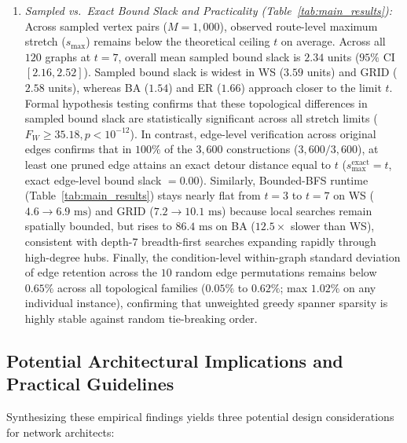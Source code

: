 \documentclass[conference]{IEEEtran}
\begin{document}
\begin{enumerate}
    \item \textit{Sampled vs.\ Exact Bound Slack and Practicality (Table~\ref{tab:main_results}):} Across sampled vertex pairs ($M = 1,000$), observed route-level maximum stretch ($s_{\max}$) remains below the theoretical ceiling $t$ on average. Across all $120$ graphs at $t=7$, overall mean sampled bound slack is $2.34$ units ($95\%$ CI $[2.16, 2.52]$). Sampled bound slack is widest in WS ($3.59$ units) and GRID ($2.58$ units), whereas BA ($1.54$) and ER ($1.66$) approach closer to the limit $t$. Formal hypothesis testing confirms that these topological differences in sampled bound slack are statistically significant across all stretch limits ($F_W \ge 35.18, p < 10^{-12}$). In contrast, edge-level verification across original edges confirms that in $100\%$ of the $3,600$ constructions ($3,600/3,600$), at least one pruned edge attains an exact detour distance equal to $t$ ($s_{\max}^{\text{exact}} = t$, exact edge-level bound slack $= 0.00$). Similarly, Bounded-BFS runtime (Table~\ref{tab:main_results}) stays nearly flat from $t=3$ to $t=7$ on WS ($4.6 \to 6.9\text{ ms}$) and GRID ($7.2 \to 10.1\text{ ms}$) because local searches remain spatially bounded, but rises to $86.4\text{ ms}$ on BA ($12.5\times$ slower than WS), consistent with depth-$7$ breadth-first searches expanding rapidly through high-degree hubs. Finally, the condition-level within-graph standard deviation of edge retention across the $10$ random edge permutations remains below $0.65\%$ across all topological families ($0.05\%$ to $0.62\%$; max $1.02\%$ on any individual instance), confirming that unweighted greedy spanner sparsity is highly stable against random tie-breaking order.
\end{enumerate}

\subsection{Potential Architectural Implications and Practical Guidelines}

Synthesizing these empirical findings yields three potential design considerations for network architects:
\end{document}
